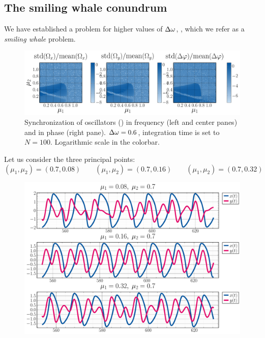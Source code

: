 \documentclass{mynotes}
\begin{document}
\subsection{ The smiling whale conundrum }

We have established a problem for higher values of \( \Delta\omega \), , which we refer as a \emph{smiling whale} problem. 

\begin{figure}[hbtp]
      \centering
      \includegraphics[width = 1.0\columnwidth]{figures/06.png}
      \caption{
            Synchronization of oscillators () in frequency (left and center panes) and in phase (right pane). \( \Delta\omega = 0.6 \), integration time is set to \( N = 100 \). {\color{rwth-red}Logarithmic scale in the colorbar.}
            \label{fig:dw06}
      }
\end{figure}

Let us consider the three principal points:
\begin{equation}
      \left( \mu_1, \mu_2 \right) = \left( 0.7, 0.08 \right) \qquad \left( \mu_1, \mu_2 \right) = \left( 0.7, 0.16 \right) \qquad \left( \mu_1, \mu_2 \right) = \left( 0.7, 0.32 \right)
\end{equation}

\begin{figure}[hbtp]
      \centering
      \includegraphics[width = 1.0\columnwidth]{figures/examples_trio.pdf} 
      \label{fig:3_solutions}
\end{figure}
\end{document}
